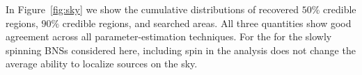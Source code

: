 In Figure~\ref{fig:sky} we show the cumulative distributions of recovered $50\%$ credible regions, $90\%$ credible regions, and searched areas. All three quantities show good agreement across all parameter-estimation techniques. For the for the slowly spinning BNSs considered here, including spin in the analysis does not change the average ability to localize sources on the sky.

  
  
  
  
  
  
  
  
  
  
  
  
  
  
  
  